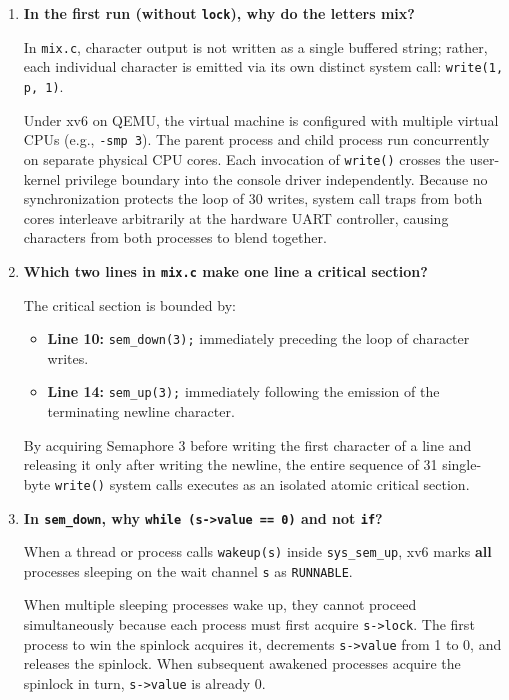 \documentclass[12pt,a4paper]{report}
\numberwithin{equation}{chapter}
\numberwithin{figure}{chapter}
\numberwithin{table}{chapter}
\begin{document}
\begin{enumerate}
    \item \textbf{In the first run (without \texttt{lock}), why do the letters mix?}
    
    In \texttt{mix.c}, character output is not written as a single buffered string; rather, each individual character is emitted via its own distinct system call: \texttt{write(1, p, 1)}. 
    
    Under xv6 on QEMU, the virtual machine is configured with multiple virtual CPUs (e.g., \texttt{-smp 3}). The parent process and child process run concurrently on separate physical CPU cores. Each invocation of \texttt{write()} crosses the user-kernel privilege boundary into the console driver independently. Because no synchronization protects the loop of 30 writes, system call traps from both cores interleave arbitrarily at the hardware UART controller, causing characters from both processes to blend together.

    \item \textbf{Which two lines in \texttt{mix.c} make one line a critical section?}
    
    The critical section is bounded by:
    \begin{itemize}
        \item \textbf{Line 10:} \texttt{sem\_down(3);} immediately preceding the loop of character writes.
        \item \textbf{Line 14:} \texttt{sem\_up(3);} immediately following the emission of the terminating newline character.
    \end{itemize}
    By acquiring Semaphore 3 before writing the first character of a line and releasing it only after writing the newline, the entire sequence of 31 single-byte \texttt{write()} system calls executes as an isolated atomic critical section.

    \item \textbf{In \texttt{sem\_down}, why \texttt{while (s->value == 0)} and not \texttt{if}?}
    
    When a thread or process calls \texttt{wakeup(s)} inside \texttt{sys\_sem\_up}, xv6 marks \textbf{all} processes sleeping on the wait channel \texttt{s} as \texttt{RUNNABLE}.
    
    When multiple sleeping processes wake up, they cannot proceed simultaneously because each process must first acquire \texttt{s->lock}. The first process to win the spinlock acquires it, decrements \texttt{s->value} from 1 to 0, and releases the spinlock. When subsequent awakened processes acquire the spinlock in turn, \texttt{s->value} is already 0. 
    

\end{enumerate}
\end{document}
